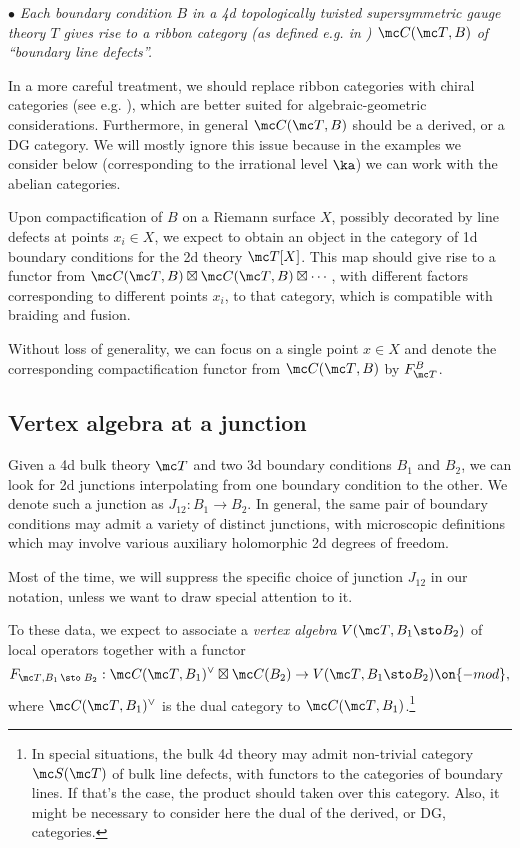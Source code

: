 \documentclass[11pt,reqno]{amsart}
\theoremstyle{plain}
\numberwithin{equation}{section}
\theoremstyle{definition}
\begin{document}
\bigskip

$\bullet$ {\em Each boundary condition $B$ in a 4d topologically
  twisted supersymmetric gauge theory $T$ gives rise to a ribbon
  category (as defined e.g. in \cite{EGNO}) ${\mc C}({\mc T},B)$ of
  ``boundary line defects''.}

\bigskip

In a more careful treatment, we should replace ribbon categories with
chiral categories (see e.g.  \cite{Raskin-chiral}), which are better
suited for algebraic-geometric considerations. Furthermore, in general
${\mc C}({\mc T},B)$ should be a derived, or a DG category. We will
mostly ignore this issue because in the examples we consider below
(corresponding to the irrational level $\ka$) we can work with the
abelian categories.

Upon compactification of $B$ on a Riemann surface $X$, possibly
decorated by line defects at points $x_i \in X$, we expect to obtain
an object in the category of 1d boundary conditions for the 2d theory
${\mc T}[X]$.  This map should give rise to a functor from ${\mc
  C}({\mc T},B) \boxtimes {\mc C}({\mc T},B) \boxtimes \cdots$, with
different factors corresponding to different points $x_i$, to that
category, which is compatible with braiding and fusion.

Without loss of generality, we can focus on a single point $x \in X$
and denote the corresponding compactification functor from ${\mc
  C}({\mc T},B)$ by $F_{\mc T}^B$.

\subsection{Vertex algebra at a junction}    \label{va j}

Given a 4d bulk theory ${\mc T}$ and two 3d boundary conditions $B_1$
and $B_2$, we can look for 2d junctions interpolating from one
boundary condition to the other. We denote such a junction as $J_{12}:
B_1 \to B_2$.  In general, the same pair of boundary conditions may
admit a variety of distinct junctions, with microscopic definitions
which may involve various auxiliary holomorphic 2d degrees of freedom.

Most of the time, we will suppress the specific choice of junction
$J_{12}$ in our notation, unless we want to draw special attention to
it.

To these data, we expect to associate a {\em vertex algebra} $V({\mc
  T},B_1\sto B_2)$ of local operators together with a functor
$$
F_{{\mc T},B_1\, \sto \; B_2}: {\mc C}({\mc T},B_1)^\vee \boxtimes {\mc
  C}(B_2) \to V({\mc T},B_1\sto B_2)\on{-mod},
$$
where ${\mc C}({\mc T},B_1)^\vee$ is the dual category to ${\mc
  C}({\mc T},B_1)$.\footnote{In special situations, the bulk 4d theory
  may admit non-trivial category ${\mc S}({\mc T})$ of bulk line
  defects, with functors to the categories of boundary lines.  If
  that's the case, the product should taken over this category. Also,
  it might be necessary to consider here the dual of the derived, or
  DG, categories.}
  
\end{document}
